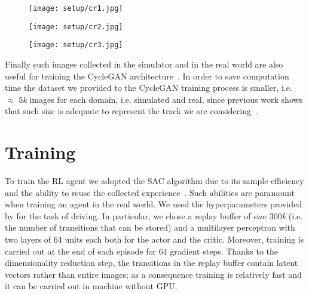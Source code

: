 \begin{figure}[h]
	\begin{minipage}{.33\textwidth}
		\centering
		\texttt{[image: setup/cr1.jpg]}
	\end{minipage}%
	\begin{minipage}{.33\textwidth}
		\centering
		\texttt{[image: setup/cr2.jpg]}
	\end{minipage}%
	\begin{minipage}{.33\textwidth}
		\centering
		\texttt{[image: setup/cr3.jpg]}
	\end{minipage}
	\label{fig:datasetrealcropped}
\end{figure}

Finally such images collected in the simulator and in the real world are also useful for training the CycleGAN architecture~\cite{CycleGAN2017}. In order to save computation time the dataset we provided to the CycleGAN training process is smaller, i.e. $\approx$ 5\textit{k} images for each domain, i.e. simulated and real, since previous work shows that such size is adequate to represent the track we are considering~\cite{stocco-mind}.


\section{Training}

To train the RL agent we adopted the SAC algorithm due to its sample efficiency and the ability to reuse the collected experience~\cite{art:sac}. Such abilities are paramount when training an agent in the real world. We used the hyperparameters provided by \cite{learning-to-drive-in-5-minutes} for the task of driving. In particular, we chose a replay buffer of size $300$\textit{k} (i.e. the number of transitions that can be stored) and a multilayer perceptron with two layers of 64 units each both for the actor and the critic. Moreover, training is carried out at the end of each episode for 64 gradient steps.  Thanks to the dimensionality reduction step, the transitions in the replay buffer contain latent vectors rather than entire images; as a consequence training is relatively fast and it can be carried out in machine without GPU. 

